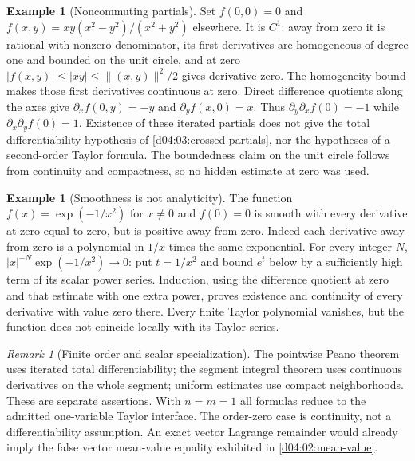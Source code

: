 \documentclass[11pt,oneside,openany]{book}
\theoremstyle{definition}
\newtheorem{example}[theorem]{Example}
\theoremstyle{remark}
\newtheorem{remark}[theorem]{Remark}
\newcommand{\abs}[1]{\lvert#1\rvert}
\newcommand{\norm}[1]{\lVert#1\rVert}
\begin{document}
\begin{example}[Noncommuting partials]\label{d04:03:mixed-counterexample}
Set $f(0,0)=0$ and
$f(x,y)=xy(x^2-y^2)/(x^2+y^2)$ elsewhere. It is $C^1$: away from zero
it is rational with nonzero denominator, its first derivatives are homogeneous
of degree one and bounded on the unit circle, and at zero
$\abs{f(x,y)}\leq\abs{xy}\leq\norm{(x,y)}^2/2$ gives derivative zero.
The homogeneity bound makes those first derivatives continuous at zero.
Direct difference quotients along the axes give
$\partial_xf(0,y)=-y$ and $\partial_yf(x,0)=x$. Thus
$\partial_y\partial_xf(0)=-1$ while
$\partial_x\partial_yf(0)=1$. Existence of these iterated partials does
not give the total differentiability hypothesis of
\cref{d04:03:crossed-partials}, nor the hypotheses of a second-order Taylor
formula. The boundedness claim on the unit circle follows from continuity
and compactness, so no hidden estimate at zero was used.
\end{example}

\begin{example}[Smoothness is not analyticity]\label{d04:03:flat-example}
The function $f(x)=\exp(-1/x^2)$ for $x\ne0$ and $f(0)=0$ is smooth
with every derivative at zero equal to zero, but is positive away from zero.
Indeed each derivative away from zero is a polynomial in $1/x$ times the
same exponential. For every integer $N$, $\abs{x}^{-N}\exp(-1/x^2)\to0$:
put $t=1/x^2$ and bound $e^t$ below by a sufficiently high term of its
scalar power series. Induction, using the difference quotient at zero and
that estimate with one extra power, proves existence and continuity of every
derivative with value zero there. Every finite Taylor polynomial vanishes,
but the function does not coincide locally with its Taylor series.
\end{example}

\begin{remark}[Finite order and scalar specialization]\label{d04:03:scope}
The pointwise Peano theorem uses iterated total differentiability; the segment
integral theorem uses continuous derivatives on the whole segment; uniform
estimates use compact neighborhoods. These are separate assertions. With
$n=m=1$ all formulas reduce to the admitted one-variable Taylor interface.
The order-zero case is continuity, not a differentiability assumption. An
exact vector Lagrange remainder would already imply the false vector
mean-value equality exhibited in \cref{d04:02:mean-value}.
\end{remark}
\end{document}

